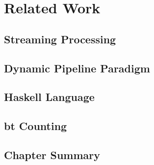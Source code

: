 \chapter{Related Work}
\section{Streaming Processing}
\section{Dynamic Pipeline Paradigm}
\section{Haskell Language}
\section{\acrlong{bt} Counting}
\section{Chapter Summary}
